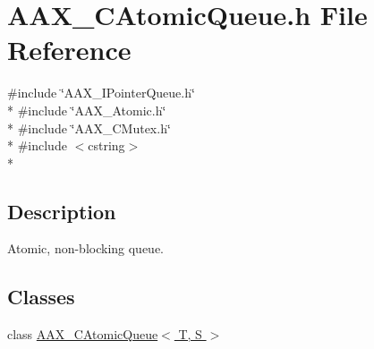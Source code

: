 \hypertarget{a00164}{}\section{A\+A\+X\+\_\+\+C\+Atomic\+Queue.\+h File Reference}
\label{a00164}
{\ttfamily \#include \char`\"{}A\+A\+X\+\_\+\+I\+Pointer\+Queue.\+h\char`\"{}}\\*
{\ttfamily \#include \char`\"{}A\+A\+X\+\_\+\+Atomic.\+h\char`\"{}}\\*
{\ttfamily \#include \char`\"{}A\+A\+X\+\_\+\+C\+Mutex.\+h\char`\"{}}\\*
{\ttfamily \#include $<$cstring$>$}\\*


\subsection{Description}
Atomic, non-\/blocking queue. 

\subsection*{Classes}
\begin{DoxyCompactItemize}
\item 
class \hyperlink{a00010}{A\+A\+X\+\_\+\+C\+Atomic\+Queue$<$ T, S $>$}
\end{DoxyCompactItemize}
